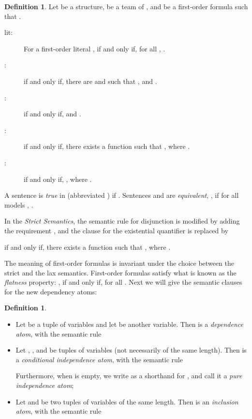\documentclass{article}
\theoremstyle{plain}
\theoremstyle{definition}
\newtheorem{definition}[theorem]{Definition}
\begin{document}
\begin{definition}
Let  be a structure,  be a team of , and  be a first-order formula such that . \begin{description}
\item[lit:] For a first-order literal ,  if and only if, for all , .
\item[:]   if and only if,  there are  and  such that ,   and .
\item[:]  if and only if,  and .
\item[:]   if and only if, there exists a function  such that , where .
\item[:]  if and only if, , where .
\end{description}
A sentence  is  \emph{true} in  (abbreviated ) if . Sentences  and  are  \emph{equivalent}, , if for all models , .
\end{definition}
In the \emph{Strict Semantics}, the semantic rule for disjunction is modified by adding the requirement , and  the clause for the existential quantifier  is replaced by 
\begin{description} 
\item  if and only if, there exists a function  such that , where . \end{description}
The meaning of first-order formulas is invariant under the choice between the strict and the lax semantics. 
First-order formulas satisfy what is known as the \emph{flatness} property:
, if and only if,    for all .
Next we will give the semantic clauses for the new dependency atoms:
\begin{definition}
\begin{itemize}
\item Let  be a tuple of variables and let  be another variable. Then  is a \emph{dependence atom}, with the semantic rule
\item Let , , and  be tuples of variables (not necessarily of the same length). Then  is a \emph{conditional independence atom}, with the semantic rule
Furthermore, when  is empty, we write  as a shorthand for , and  call it a \emph{pure independence atom};
\item Let  and  be two tuples of variables of the same length. Then  is an \emph{inclusion atom}, with the semantic rule 
\end{itemize}
\end{definition}
\end{document}
